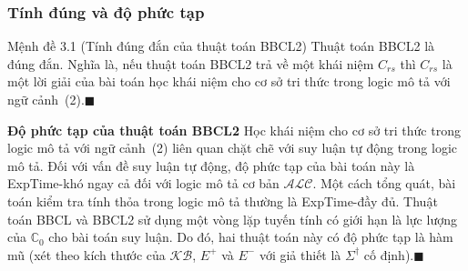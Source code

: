 \documentclass[notheorems,xcolor=dvipsnames]{beamer}
\newcommand{\mbC}		{\mathbb{C}}
\newcommand{\SigmaDag}	{\Sigma^\dag}
\newcommand{\KB}		{\mathcal{KB}}
\newcommand{\ALC}		{$\mathcal{ALC}$\xspace}
\newcommand{\BBCLearn}		{BBCL\xspace}
\newcommand{\BBCLearnS}		{BBCL2\xspace}
\newcommand{\myend}		{\mbox{}\hfill\mbox{{\tiny$\!\blacksquare$}}}
\newcommand{\EXPTIME}	{{\sc ExpTime}\xspace}
\begin{document}
\begin{frame}\frametitle{\bf Tính đúng và độ phức tạp}
	\vspace{-1.5ex}
	\begin{block}{Mệnh đề 3.1 (Tính đúng đắn của thuật toán \BBCLearnS)}
		Thuật toán \BBCLearnS là đúng đắn. Nghĩa là, nếu thuật toán \BBCLearnS trả về một khái niệm $C_{rs}$ thì $C_{rs}$ là một lời giải của bài toán học khái niệm cho cơ sở tri thức trong logic mô tả với ngữ cảnh~(2).\myend
	\end{block}
	\vspace{-1.0ex}
		
	\begin{block}{\bf Độ phức tạp của thuật toán \BBCLearnS}
		Học khái niệm cho cơ sở tri thức trong logic mô tả với ngữ cảnh~(2) liên quan chặt chẽ với suy luận tự động trong logic mô tả. Đối với vấn đề suy luận tự động, độ phức tạp của bài toán này là \EXPTIME-\textnormal{khó} ngay cả đối với logic mô tả cơ bản \ALC. Một cách tổng quát, bài toán kiểm tra tính thỏa trong logic mô tả thường là \EXPTIME-\textnormal{đầy đủ}. Thuật toán \BBCLearn và \BBCLearnS sử dụng một vòng lặp tuyến tính có giới hạn là lực lượng của $\mbC_0$ cho bài toán suy luận. Do đó, hai thuật toán này có độ phức tạp là hàm mũ (xét theo kích thước của $\KB$, $E^+$ và $E^-$ với giả thiết là $\SigmaDag$ cố định).\myend
	\end{block}
\end{frame}
\end{document}
